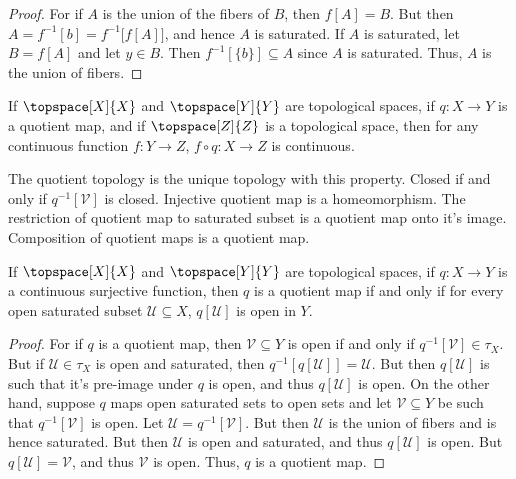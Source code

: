 \documentclass{article}                                                        %
\begin{document}
        \begin{proof}
            For if $A$ is the union of the fibers of $B$, then
            $f[A]=B$. But then $A=f^{\minus{1}}[b]=f^{\minus{1}}\big[f[A]\big]$,
            and hence $A$ is saturated. If $A$ is saturated, let $B=f[A]$ and
            let $y\in{B}$. Then $f^{\minus{1}}[\{b\}]\subseteq{A}$ since $A$ is
            saturated. Thus, $A$ is the union of fibers.
        \end{proof}
        \begin{theorem}
            If $\topspace[X]{X}$ and $\topspace[Y]{Y}$ are topological spaces,
            if $q:X\rightarrow{Y}$ is a quotient map, and if
            $\topspace[Z]{Z}$ is a topological space, then for any continuous
            function $f:Y\rightarrow{Z}$, $f\circ{q}:X\rightarrow{Z}$ is
            continuous.
        \end{theorem}
        The quotient topology is the unique topology with this property. Closed
        if and only if $q^{\minus{1}}[\mathcal{V}]$ is closed. Injective
        quotient map is a homeomorphism. The restriction of quotient map to
        saturated subset is a quotient map onto it's image. Composition of
        quotient maps is a quotient map.
        \begin{theorem}
            If $\topspace[X]{X}$ and $\topspace[Y]{Y}$ are topological spaces,
            if $q:X\rightarrow{Y}$ is a continuous surjective function, then
            $q$ is a quotient map if and only if for every open saturated subset
            $\mathcal{U}\subseteq{X}$, $q[\mathcal{U}]$ is open in $Y$.
        \end{theorem}
        \begin{proof}
            For if $q$ is a quotient map, then $\mathcal{V}\subseteq{Y}$ is
            open if and only if $q^{\minus{1}}[\mathcal{V}]\in\tau_{X}$. But
            if $\mathcal{U}\in\tau_{X}$ is open and saturated, then
            $q^{\minus{1}}[q[\mathcal{U}]]=\mathcal{U}$. But then
            $q[\mathcal{U}]$ is such that it's pre-image under $q$ is open, and
            thus $q[\mathcal{U}]$ is open. On the other hand, suppose $q$ maps
            open saturated sets to open sets and let $\mathcal{V}\subseteq{Y}$
            be such that $q^{\minus{1}}[\mathcal{V}]$ is open. Let
            $\mathcal{U}=q^{\minus{1}}[\mathcal{V}]$. But then $\mathcal{U}$ is
            the union of fibers and is hence saturated. But then $\mathcal{U}$
            is open and saturated, and thus $q[\mathcal{U}]$ is open. But
            $q[\mathcal{U}]=\mathcal{V}$, and thus $\mathcal{V}$ is open. Thus,
            $q$ is a quotient map.
        \end{proof}
\end{document}
